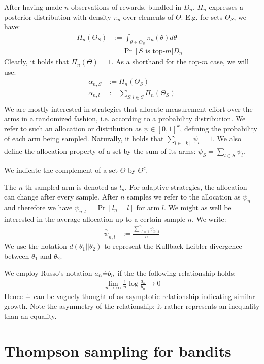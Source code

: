 After having made $n$ observations of rewards, bundled in $D_n$, $\Pi_n$
expresses a posterior distribution with density $\pi_n$ over elements of
$\Theta$. E.g. for sets $\Theta_{S}$, we have:
\begin{align}
  \Pi_n(\Theta_{S}) &:= \int_{\theta \in \Theta_{S}} \pi_n(\theta)
      d\theta \\
    &= \Pr[S \text{ is top-}m | D_n]
\end{align}
Clearly, it holds that $\Pi_n(\Theta) = 1$. As a shorthand for the top-$m$ case, we will use:
\begin{align}
  \alpha_{n, S} &:= \Pi_n(\Theta_{S}) \\
  \alpha_{n, l} &:= \sum_{S: l \in S} \Pi_n(\Theta_{S}) \\
\end{align}
We are mostly interested in strategies that allocate measurement effort over the
arms in a randomized fashion, i.e. according to a probability distribution. We
refer to such an allocation or distribution as $\psi \in [0, 1]^k$, defining the
probability of each arm being sampled. Naturally, it holds that $\sum_{l \in
[k]} \psi_l = 1$. We also define the allocation property of a set by the sum of
its arms: $\psi_S = \sum_{l \in S} \psi_l$.

We indicate the complement of a set $\Theta$ by $\Theta^c$.

The $n$-th sampled arm is denoted as $l_n$. For adaptive strategies, the
allocation can change after every sample. After $n$ samples we refer to the
allocation as $\psi_{n}$ and therefore we have $\psi_{n, l} = \Pr[l_n = l]$ for
arm $l$. We might as well be interested in the average allocation up to a
certain sample $n$. We write:
\begin{align}
  \bar{\psi}_{n, l} &:= \frac{\sum_{n' = 1}^{n} \psi_{n', l}}{n}
\end{align}
We use the notation $d(\theta_1||\theta_2)$ to represent the Kullback-Leibler
divergence between $\theta_1$ and $\theta_2$.

We employ Russo's notation $a_n \dot{=} b_n$ if the the following relationship
holds:
\begin{align}
  \lim_{n \rightarrow \infty}\frac{1}{n}\log{\frac{a_n}{b_n}} \rightarrow 0
\end{align}
Hence $\dot{=}$ can be vaguely thought of as asymptotic relationship indicating
similar growth. Note the asymmetry of the relationship: it rather
represents an inequality than an equality.

\section{Thompson sampling for bandits}

